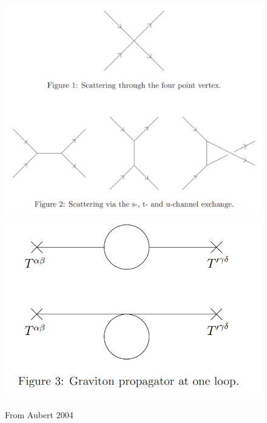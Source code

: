 \documentclass{book}
\theoremstyle{definition}
\begin{document}
	\begin{figure}[!htb]
		\centering
		\includegraphics[scale=0.6]{scat}
		\includegraphics[scale=0.6]{loop}
		\caption{From Aubert 2004}
	\end{figure}
\end{document}
